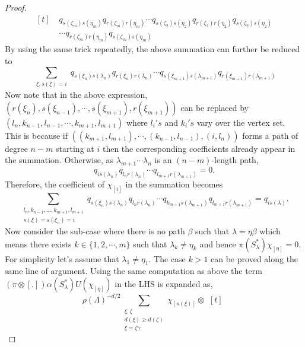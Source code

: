 \documentclass{amsart}
\theoremstyle{plain}
\theoremstyle{definition}
\theoremstyle{remark}
\numberwithin{equation}{section}
\begin{document}
\begin{proof}
\begin{equation*}
\begin{aligned}[t]
&\;q_{s(\zeta_{m})s(\eta_{m})}q_{r(\zeta_{m})r(\eta_{m})}\cdots q_{s(\zeta_{2})s(\eta_{2})}q_{r(\zeta_{2})r(\eta_{2})}q_{s(\zeta_{2})s(\eta_{2})}\\
&\;\cdots q_{r(\zeta_{m})r(\eta_{m})}q_{s(\zeta_{m})s(\eta_{m})}
\end{aligned}
\end{equation*}
By using the same trick repeatedly, the above summation can further be reduced to
\begin{equation*}
    \sum\limits_{\substack{\xi,
s(\xi)=i}}q_{s(\xi_{n})s(\lambda_{n})}q_{r(\xi_{n})r(\lambda_{n})}\cdots q_{s(\xi_{m+1})s(\lambda_{m+1})}q_{r(\xi_{m+1})r(\lambda_{m+1})}
\end{equation*}
Now note that in the above expression, $(r(\xi_{n}),s(\xi_{n-1}),\cdots, s(\xi_{m+1}),r(\xi_{m+1}))$ can be replaced by $(l_{n},k_{n-1},l_{n-1},\cdots,k_{m+1},l_{m+1})$ where $l_{i}'s$ and $k_{i}'s$ vary over the vertex set. This is because if $((k_{m+1},l_{m+1}),\cdots,(k_{n-1},l_{n-1}),(i,l_{n}))$ forms a path of degree $n-m$ starting at $i$ then the corresponding coefficients already appear in the summation. Otherwise, as $\lambda_{m+1}\cdots\lambda_{n}$ is an $(n-m)$-length path, \begin{displaymath}q_{is(\lambda_{n})}q_{l_{n}r(\lambda_{n})}\cdots q_{l_{m+1}r(\lambda_{m+1})}=0.\end{displaymath} Therefore, the coefficient of $\chi_{[i]}$ in the summation becomes
\begin{equation*}
    \sum\limits_{\substack{l_{n},k_{n-1},\ldots,k_{m+1},l_{m+1}\\s(\xi)=s(\xi_{n})=i}}q_{s(\xi_{n})s(\lambda_{n})}q_{l_{n}r(\lambda_{n})}\cdots q_{k_{m+1}s(\lambda_{m+1})}q_{l_{m+1}r(\lambda_{m+1})}=q_{is(\lambda)}.
\end{equation*}
Now consider the sub-case where there is no path $\beta$ such that $\lambda=\eta\beta$ which means there exists $k\in\{1,2,\cdots,m\}$ such that $\lambda_{k}\neq \eta_{k}$  and hence $\pi(S_{\lambda}^{\ast})\chi_{[\eta]}=0$. For simplicity let's assume that $\lambda_{1}\neq \eta_{1}$. The case $k>1$ can be proved along the same line of argument. Using the same computation as above the term $(\pi\otimes [.]) \alpha(S_{\lambda}^{\ast})U(\chi_{[\eta]})$ in the LHS is expanded as,
\begin{equation*}
    \rho(\Lambda)^{-d/2}\sum\limits_{\substack{\xi,\zeta\\ d(\xi)\geq d(\zeta) \\ \xi=\zeta\gamma}}\chi_{[s(\xi)]}\otimes 
\begin{aligned}[t]

\end{aligned}
\end{equation*}
\end{proof}
\end{document}
